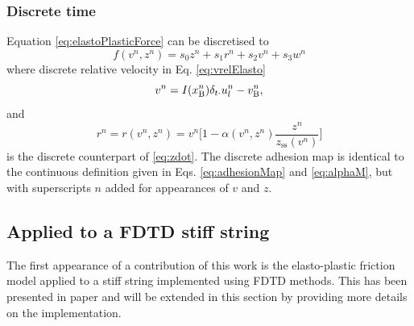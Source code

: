 \subsubsection{Discrete time}
Equation \eqref{eq:elastoPlasticForce} can be discretised to
\begin{equation}\label{eq:discForceFunction}
    f(v^n,z^n) = s_0z^n + s_1r^n+s_2v^n+s_3w^n
\end{equation} 
where discrete relative velocity in Eq. \eqref{eq:vrelElasto}
\begin{equation}\label{eq:vrelElastoDisc}
    v^n = I(x_{\text{B}}^n)\delta_{t\cdot}u_l^n - v_{\text{B}}^n,
\end{equation}
and 
\begin{equation}\label{eq:r}
    r^n = r(v^n,z^n) = v^n\bigg[1-\alpha(v^n,z^n)\frac{z^n}{z_\text{ss}(v^n)}\bigg]
\end{equation}
is the discrete counterpart of \eqref{eq:zdot}. The discrete adhesion map is identical to the continuous definition given in Eqs. \eqref{eq:adhesionMap} and \eqref{eq:alphaM}, but with superscripts $n$ added for appearances of $v$ and $z$.

\subsection{Applied to a FDTD stiff string}
The first appearance of a contribution of this work is the elasto-plastic friction model applied to a stiff string implemented using FDTD methods. This has been presented in paper \citeP[C] and will be extended in this section by providing more details on the implementation.

